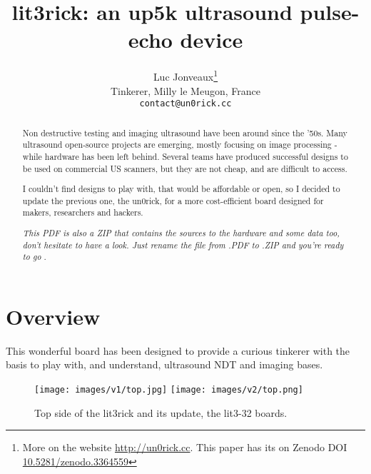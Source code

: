 \documentclass{article}
\title{lit3rick: an up5k ultrasound pulse-echo device}
\author{
  Luc Jonveaux\thanks{More on the website \url{http://un0rick.cc}. This paper has its on Zenodo DOI  \href{http://doi.org/10.5281/zenodo.3364559}{10.5281/zenodo.3364559} } \\
  Tinkerer, Milly le Meugon, France\\
  \texttt{contact@un0rick.cc} \\
}
\begin{document}
\maketitle

\begin{abstract}
Non destructive testing and imaging ultrasound have been around since the ’50s. Many ultrasound open-source projects are emerging, mostly focusing on image processing - while hardware has been left behind. Several teams have produced successful designs to be used on commercial US scanners, but they are not cheap, and are difficult to access. 

I couldn’t find designs to play with, that would be affordable or open, so I decided to update the previous one, the un0rick, for a more cost-efficient board designed for makers, researchers and hackers.

\emph{ This PDF is also a ZIP that contains the sources to the hardware and some data too, don't hesitate to have a look. Just rename the file from .PDF to .ZIP and you're ready to go }.
\end{abstract}






\section{Overview}

This wonderful board has been designed to provide a curious tinkerer with the basis to play with, and understand, ultrasound NDT and imaging bases.



\begin{figure}[htp!]
  \centering
  \texttt{[image: images/v1/top.jpg]}\hfill
  \texttt{[image: images/v2/top.png]} 
  \caption{Top side of the lit3rick and its update, the lit3-32 boards.} 
  \label{fig:images}
  \end{figure}
 
\end{document}
